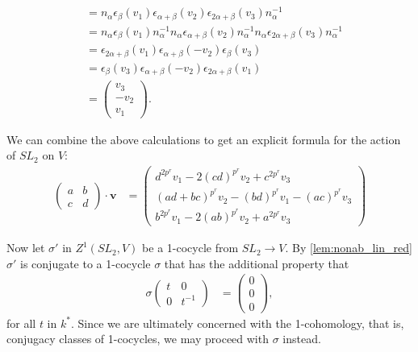 \begin{align*}
				&= 
				n_ \alpha  \epsilon_ \beta (v_1)\epsilon_{\alpha+\beta}(v_2) \epsilon_{2\alpha+\beta}(v_3) n_ \alpha^{-1}\\
					&= 
					n_ \alpha  \epsilon_\beta (v_1) n_ \alpha^{-1}n_ \alpha \epsilon_{\alpha+\beta}(v_2) n_ \alpha^{-1} n_ \alpha \epsilon_{2\alpha+\beta}(v_3) n_ \alpha^{-1}\\
						&= 
						\epsilon_{2\alpha+\beta} (v_1) \epsilon_{\alpha+\beta}(-v_2)  \epsilon_{\beta}(v_3) \\
							&= 
							\epsilon_{\beta}(v_3) \epsilon_{\alpha+\beta}(-v_2) \epsilon_{2\alpha+\beta} (v_1)\\
								&= \left(\begin{matrix} v_3 \\ -v_2 \\ v_1 \end{matrix}\right).
								\end{align*}

								We can combine the above calculations to get an explicit formula for the action of $SL_2$ on $V$:
								\begin{align*}
								\left(\begin{matrix} a & b \\ c & d\end{matrix}\right) \cdot \mathbf{v} &=
								\left(\begin{matrix}
										d^{2p^r}v_1 -2(cd)^{p^r}v_2 + c^{2p^r}v_3 \\
										(ad + bc)^{p^r}v_2 - (bd)^{p^r}v_1 - (ac)^{p^r}v_3 \\
										b^{2p^r}v_1 -2(ab)^{p^r}v_2 + a^{2p^r}v_3
										\end{matrix}\right)
								\end{align*}

								Now let $\sigma'$ in $Z^1(SL_2, V)$ be a 1-cocycle from $SL_2\rightarrow V$. By \ref{lem:nonab_lin_red} $\sigma'$ is conjugate to a 1-cocycle $\sigma$ that has the additional property that
								\begin{align*}
								\sigma\left( \begin{matrix} t & 0 \\ 0 & t^{-1}\end{matrix}\right) &= 
								\left( \begin{matrix} 0 \\ 0 \\0\end{matrix}\right),
								\end{align*}
								for all $t$ in $k^*$. Since we are ultimately concerned with the 1-cohomology, that is, conjugacy classes of 1-cocycles, we may proceed with $\sigma$ instead.

